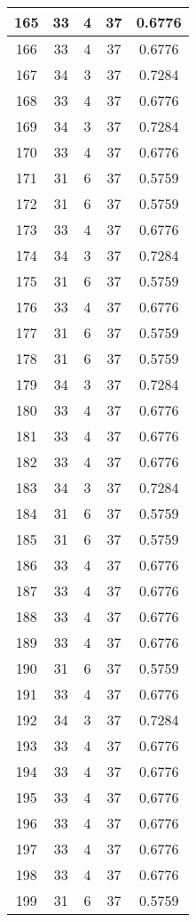 \documentclass[letterpaper, 12pt]{article}
\begin{document}
\begin{longtable}{|c|c|c|c|c|}
\hline
165 & 33 & 4 & 37 & 0.6776 \\
\hline
166 & 33 & 4 & 37 & 0.6776 \\
\hline
167 & 34 & 3 & 37 & 0.7284 \\
\hline
168 & 33 & 4 & 37 & 0.6776 \\
\hline
169 & 34 & 3 & 37 & 0.7284 \\
\hline
170 & 33 & 4 & 37 & 0.6776 \\
\hline
171 & 31 & 6 & 37 & 0.5759 \\
\hline
172 & 31 & 6 & 37 & 0.5759 \\
\hline
173 & 33 & 4 & 37 & 0.6776 \\
\hline
174 & 34 & 3 & 37 & 0.7284 \\
\hline
175 & 31 & 6 & 37 & 0.5759 \\
\hline
176 & 33 & 4 & 37 & 0.6776 \\
\hline
177 & 31 & 6 & 37 & 0.5759 \\
\hline
178 & 31 & 6 & 37 & 0.5759 \\
\hline
179 & 34 & 3 & 37 & 0.7284 \\
\hline
180 & 33 & 4 & 37 & 0.6776 \\
\hline
181 & 33 & 4 & 37 & 0.6776 \\
\hline
182 & 33 & 4 & 37 & 0.6776 \\
\hline
183 & 34 & 3 & 37 & 0.7284 \\
\hline
184 & 31 & 6 & 37 & 0.5759 \\
\hline
185 & 31 & 6 & 37 & 0.5759 \\
\hline
186 & 33 & 4 & 37 & 0.6776 \\
\hline
187 & 33 & 4 & 37 & 0.6776 \\
\hline
188 & 33 & 4 & 37 & 0.6776 \\
\hline
189 & 33 & 4 & 37 & 0.6776 \\
\hline
190 & 31 & 6 & 37 & 0.5759 \\
\hline
191 & 33 & 4 & 37 & 0.6776 \\
\hline
192 & 34 & 3 & 37 & 0.7284 \\
\hline
193 & 33 & 4 & 37 & 0.6776 \\
\hline
194 & 33 & 4 & 37 & 0.6776 \\
\hline
195 & 33 & 4 & 37 & 0.6776 \\
\hline
196 & 33 & 4 & 37 & 0.6776 \\
\hline
197 & 33 & 4 & 37 & 0.6776 \\
\hline
198 & 33 & 4 & 37 & 0.6776 \\
\hline
199 & 31 & 6 & 37 & 0.5759 \\
\hline
\end{longtable}
\end{document}
